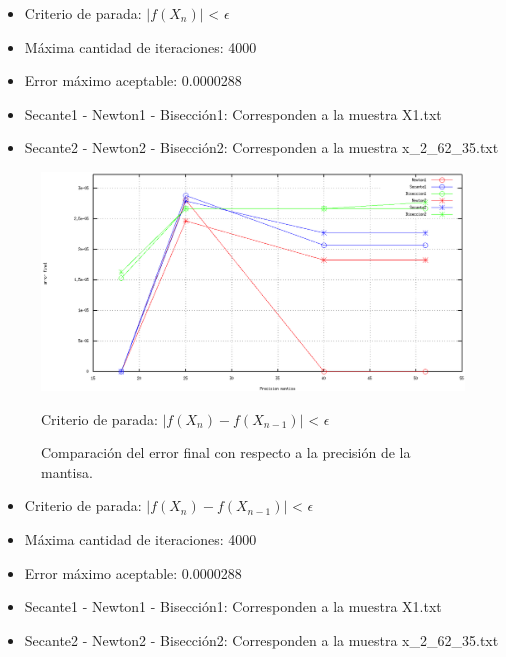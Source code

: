 \documentclass[10pt, a4paper]{article}
\begin{document}
\begin{itemize}
\item Criterio de parada: $|f(X_{n})|$ < $\epsilon$ 
\item M\'axima cantidad de iteraciones: 4000
\item Error m\'aximo aceptable: 0.0000288
\item Secante1 - Newton1 - Bisecci\'on1: Corresponden a la muestra X1.txt
\item Secante2 - Newton2 - Bisecci\'on2: Corresponden a la muestra x\_2\_62\_35.txt
\end{itemize}


\begin{figure}[H] %
\begin{center}
\includegraphics[width=370pt]{./error2.png}
\caption[h]{Comparaci\'on del error final con respecto a la precisi\'on de la mantisa.}{Criterio de parada: $|f(X_{n}) - f(X_{n-1})|$ < $\epsilon$}
\end{center}
\end{figure}

\begin{itemize}
\item Criterio de parada: $|f(X_{n}) - f(X_{n-1})|$ < $\epsilon$ 
\item M\'axima cantidad de iteraciones: 4000
\item Error m\'aximo aceptable: 0.0000288
\item Secante1 - Newton1 - Bisecci\'on1: Corresponden a la muestra X1.txt
\item Secante2 - Newton2 - Bisecci\'on2: Corresponden a la muestra x\_2\_62\_35.txt
\end{itemize}
\end{document}
